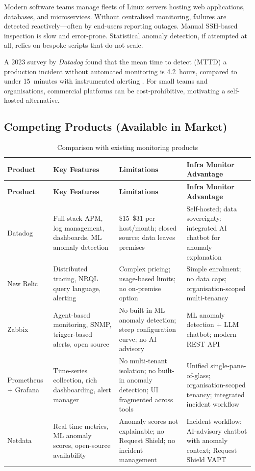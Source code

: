 Modern software teams manage fleets of Linux servers hosting web applications,
databases, and microservices.  Without centralised monitoring, failures are
detected reactively---often by end-users reporting outages.  Manual
SSH-based inspection is slow and error-prone.  Statistical anomaly detection,
if attempted at all, relies on bespoke scripts that do not scale.

A 2023 survey by \textit{Datadog} found that the mean time to detect (MTTD) a
production incident without automated monitoring is 4.2~hours, compared to
under 15~minutes with instrumented alerting \cite{pressman2019}.
For small teams and organisations, commercial platforms can be cost-prohibitive,
motivating a self-hosted alternative.

\subsection{Competing Products (Available in Market)}

\begin{longtable}{@{}>{\raggedright\arraybackslash}p{} >{\raggedright\arraybackslash}p{} >{\raggedright\arraybackslash}p{} >{\raggedright\arraybackslash}p{}@{}}
\caption{Comparison with existing monitoring products}\label{tab:competitors}\\
\toprule
\textbf{Product} & \textbf{Key Features} & \textbf{Limitations} & \textbf{Infra Monitor Advantage}\\
\midrule
\endfirsthead
\toprule
\textbf{Product} & \textbf{Key Features} & \textbf{Limitations} & \textbf{Infra Monitor Advantage}\\
\midrule
\endhead
Datadog &
  Full-stack APM, log management, dashboards, ML anomaly detection &
  \$15--\$31 per host/month; closed source; data leaves premises &
  Self-hosted; data sovereignty; integrated AI chatbot for anomaly explanation\\
\midrule
New Relic &
  Distributed tracing, NRQL query language, alerting &
  Complex pricing; usage-based limits; no on-premise option &
  Simple enrolment; no data caps; organisation-scoped multi-tenancy\\
\midrule
Zabbix &
  Agent-based monitoring, SNMP, trigger-based alerts, open source &
  No built-in ML anomaly detection; steep configuration curve; no AI advisory &
  ML anomaly detection + LLM chatbot; modern REST API\\
\midrule
Prometheus + Grafana &
  Time-series collection, rich dashboarding, alert manager &
  No multi-tenant isolation; no built-in anomaly detection; UI fragmented across tools &
  Unified single-pane-of-glass; organisation-scoped tenancy; integrated incident workflow\\
\midrule
Netdata &
  Real-time metrics, ML anomaly scores, open-source availability &
  Anomaly scores not explainable; no Request Shield; no incident management &
  Incident workflow; AI-advisory chatbot with anomaly context; Request Shield VAPT\\
\bottomrule
\end{longtable}

